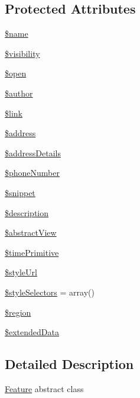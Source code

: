 \subsection*{Protected Attributes}
\begin{DoxyCompactItemize}
\item 
\hyperlink{classFeature_a4fea6cd5eb7b4dca282fcf97fb203b50}{\$name}
\item 
\hyperlink{classFeature_a2967cfe3dc59926eda49da5a1ddbb604}{\$visibility}
\item 
\hyperlink{classFeature_a5d37f0904db4f63f757c69ec363542c7}{\$open}
\item 
\hyperlink{classFeature_a13785dc5508baa857708ee4439e4a3be}{\$author}
\item 
\hyperlink{classFeature_a9c85374612196745990778ebadc8332e}{\$link}
\item 
\hyperlink{classFeature_aeda1858217ef0dd63453b8b5ff25e61c}{\$address}
\item 
\hyperlink{classFeature_a97b441c0b078bfc1503fe573a8453089}{\$addressDetails}
\item 
\hyperlink{classFeature_a97a83561d0dfcb087f3719acea867529}{\$phoneNumber}
\item 
\hyperlink{classFeature_a0b8063b6558abd10e8c577d5a6c1aeb0}{\$snippet}
\item 
\hyperlink{classFeature_acab4748e1a229e9dd7fd0dc21bbae673}{\$description}
\item 
\hyperlink{classFeature_a853335604692396a24afc819cfa5fe18}{\$abstractView}
\item 
\hyperlink{classFeature_abff79fd8c7eb59df7883dc60f814ac98}{\$timePrimitive}
\item 
\hyperlink{classFeature_a5be57f391a1948c8d245d79833ea85d0}{\$styleUrl}
\item 
\hyperlink{classFeature_a18026dae4110abd86f184f62d303cb02}{\$styleSelectors} = array()
\item 
\hyperlink{classFeature_ab39d80ac32d6eed774fc322bd2874025}{\$region}
\item 
\hyperlink{classFeature_a3048dbfb4e874cdbbcd83fdb9df2c1be}{\$extendedData}
\end{DoxyCompactItemize}


\subsection{Detailed Description}
\hyperlink{classFeature}{Feature} abstract class 

